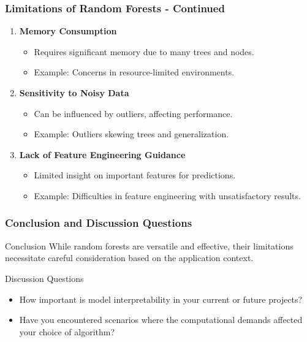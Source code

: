 \documentclass[aspectratio=169]{beamer}
\begin{document}
\begin{frame}[fragile]
    \frametitle{Limitations of Random Forests - Continued}
    \begin{enumerate}[resume]
        \item \textbf{Memory Consumption}
        \begin{itemize}
            \item Requires significant memory due to many trees and nodes.
            \item Example: Concerns in resource-limited environments.
        \end{itemize}
        
        \item \textbf{Sensitivity to Noisy Data}
        \begin{itemize}
            \item Can be influenced by outliers, affecting performance.
            \item Example: Outliers skewing trees and generalization.
        \end{itemize}

        \item \textbf{Lack of Feature Engineering Guidance}
        \begin{itemize}
            \item Limited insight on important features for predictions.
            \item Example: Difficulties in feature engineering with unsatisfactory results.
        \end{itemize}
    \end{enumerate}
\end{frame}

\begin{frame}[fragile]
    \frametitle{Conclusion and Discussion Questions}
    \begin{block}{Conclusion}
        While random forests are versatile and effective, their limitations necessitate careful consideration based on the application context. 
    \end{block}
    \begin{block}{Discussion Questions}
        \begin{itemize}
            \item How important is model interpretability in your current or future projects?
            \item Have you encountered scenarios where the computational demands affected your choice of algorithm? 
        \end{itemize}
    \end{block}
\end{frame}
\end{document}
